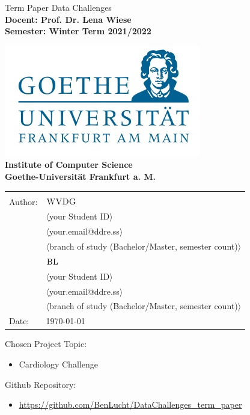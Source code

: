 \begin{center}

{\Huge {
Term Paper Data Challenges}
}
\\[2ex]

\textbf{
\Large 
Docent: Prof. Dr. Lena Wiese \\ 
Semester: Winter Term 2021/2022\\  
}



\includegraphics[scale=0.4]{images/logo.jpg} \\ 
\large{\textbf{Institute of Computer Science \\ Goethe-Universit\"at Frankfurt a. M.}}



\begin{normalsize}
\begin{tabular}{ll}
& \\
Author: & $\textsc{WVDG}$ \\
& $\langle$your Student ID$\rangle$\\
& $\langle$your.email@ddre.ss$\rangle$ \\
& $\langle$branch of study (Bachelor/Master, semester count)$\rangle$ \\
& $\textsc{BL}$ \\
& $\langle$your Student ID$\rangle$\\
& $\langle$your.email@ddre.ss$\rangle$ \\
& $\langle$branch of study (Bachelor/Master, semester count)$\rangle$ \\
Date: & \today \\		
\end{tabular}
\end{normalsize}

\end{center}

\vspace*{\fill}

\large
\noindent{}Chosen Project Topic: %
\begin{itemize}
\item Cardiology Challenge
\end{itemize}
\noindent{}Github Repository: %
\begin{itemize}
\item \url{https://github.com/BenLucht/DataChallenges_term_paper}
\end{itemize}